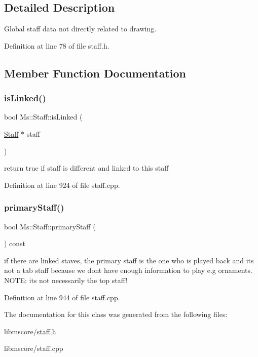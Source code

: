 \subsection{Detailed Description}
Global staff data not directly related to drawing. 

Definition at line 78 of file staff.\+h.



\subsection{Member Function Documentation}
\mbox{\label{class_ms_1_1_staff_a29b2740812d349e8a303926ea265c37c}} 
\subsubsection{\texorpdfstring{is\+Linked()}{isLinked()}}
{\footnotesize\ttfamily bool Ms\+::\+Staff\+::is\+Linked (\begin{DoxyParamCaption}\item[{\hyperlink{class_ms_1_1_staff}{Staff} $\ast$}]{staff }\end{DoxyParamCaption})}

return true if staff is different and linked to this staff 

Definition at line 924 of file staff.\+cpp.

\mbox{\label{class_ms_1_1_staff_ab2b239f1f1d6f3498015a21270cc2d92}} 
\subsubsection{\texorpdfstring{primary\+Staff()}{primaryStaff()}}
{\footnotesize\ttfamily bool Ms\+::\+Staff\+::primary\+Staff (\begin{DoxyParamCaption}{ }\end{DoxyParamCaption}) const}

if there are linked staves, the primary staff is the one who is played back and it\textquotesingle{}s not a tab staff because we don\textquotesingle{}t have enough information to play e.\+g ornaments. N\+O\+TE\+: it\textquotesingle{}s not necessarily the top staff! 

Definition at line 944 of file staff.\+cpp.



The documentation for this class was generated from the following files\+:\begin{DoxyCompactItemize}
\item 
libmscore/\hyperlink{staff_8h}{staff.\+h}\item 
libmscore/staff.\+cpp\end{DoxyCompactItemize}
